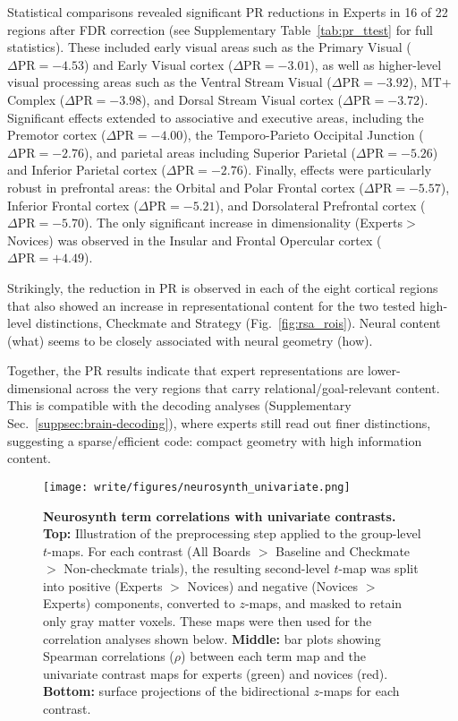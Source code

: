 \documentclass[preprint,12pt]{elsarticle}
\begin{document}
Statistical comparisons revealed significant PR reductions in Experts in 16 of 22 regions after FDR correction (see Supplementary Table~\ref{tab:pr_ttest} for full statistics). These included early visual areas such as the Primary Visual ($\Delta \mathrm{PR} = -4.53$) and Early Visual cortex ($\Delta \mathrm{PR} = -3.01$), as well as higher-level visual processing areas such as the Ventral Stream Visual ($\Delta \mathrm{PR} = -3.92$), MT+ Complex ($\Delta \mathrm{PR} = -3.98$), and Dorsal Stream Visual cortex ($\Delta \mathrm{PR} = -3.72$). Significant effects extended to associative and executive areas, including the Premotor cortex ($\Delta \mathrm{PR} = -4.00$), the Temporo-Parieto Occipital Junction ($\Delta \mathrm{PR} = -2.76$), and parietal areas including Superior Parietal ($\Delta \mathrm{PR} = -5.26$) and Inferior Parietal cortex ($\Delta \mathrm{PR} = -2.76$). Finally, effects were particularly robust in prefrontal areas: the Orbital and Polar Frontal cortex ($\Delta \mathrm{PR} = -5.57$), Inferior Frontal cortex ($\Delta \mathrm{PR} = -5.21$), and Dorsolateral Prefrontal cortex ($\Delta \mathrm{PR} = -5.70$). The only significant increase in dimensionality (Experts$>$Novices) was observed in the Insular and Frontal Opercular cortex ($\Delta \mathrm{PR} = +4.49$).

Strikingly, the reduction in PR is observed in each of the eight cortical regions that also showed an increase in representational content for the two tested high-level distinctions, Checkmate and Strategy (Fig.~\ref{fig:rsa_rois}). Neural content (what) seems to be closely associated with neural geometry (how).  

Together, the PR results indicate that expert representations are lower-dimensional across the very regions that carry relational/goal-relevant content. This is compatible with the decoding analyses (Supplementary Sec.~\ref{suppsec:brain-decoding}), where experts still read out finer distinctions, suggesting a sparse/efficient code: compact geometry with high information content.

\begin{figure}[!htp]
  \centering
  \texttt{[image: write/figures/neurosynth\_univariate.png]}
  \caption{
    \textbf{Neurosynth term correlations with univariate contrasts.} \textbf{Top:} Illustration of the preprocessing step applied to the group-level $t$-maps. For each contrast (All Boards $>$ Baseline and Checkmate $>$ Non-checkmate trials), the resulting second-level $t$-map was split into positive (Experts $>$ Novices) and negative (Novices $>$ Experts) components, converted to $z$-maps, and masked to retain only gray matter voxels. These maps were then used for the correlation analyses shown below. \textbf{Middle:} bar plots showing Spearman correlations ($\rho$) between each term map and the univariate contrast maps for experts (green) and novices (red). \textbf{Bottom:} surface projections of the bidirectional $z$-maps for each contrast.
  }
  \label{fig:neurosynth_univariate}
\end{figure}
\end{document}

